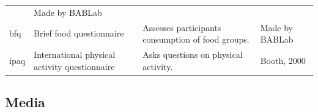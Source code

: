 \documentclass[]{book}
\begin{document}
\begin{longtable}[]{@{}llll@{}}
\begin{minipage}[t]{0.22\columnwidth}
\end{minipage} & \begin{minipage}[t]{0.18\columnwidth}\raggedright
Made by BABLab\strut
\end{minipage}\tabularnewline
\begin{minipage}[t]{0.22\columnwidth}\raggedright
bfq\strut
\end{minipage} & \begin{minipage}[t]{0.27\columnwidth}\raggedright
Brief food questionnaire\strut
\end{minipage} & \begin{minipage}[t]{0.22\columnwidth}\raggedright
Assesses participants consumption of food groups.\strut
\end{minipage} & \begin{minipage}[t]{0.18\columnwidth}\raggedright
Made by BABLab\strut
\end{minipage}\tabularnewline
\begin{minipage}[t]{0.22\columnwidth}\raggedright
ipaq\strut
\end{minipage} & \begin{minipage}[t]{0.27\columnwidth}\raggedright
International physical activity questionnaire\strut
\end{minipage} & \begin{minipage}[t]{0.22\columnwidth}\raggedright
Asks questions on physical activity.\strut
\end{minipage} & \begin{minipage}[t]{0.18\columnwidth}\raggedright
Booth, 2000\strut
\end{minipage}\tabularnewline
\bottomrule
\end{longtable}

\hypertarget{media}{%
\subsection{Media}\label{media}}
\end{document}
